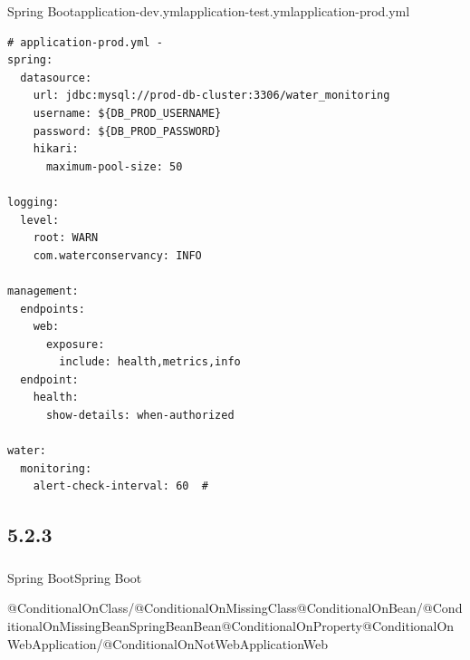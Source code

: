 Spring
Bootapplication-dev.ymlapplication-test.ymlapplication-prod.yml

\begin{lstlisting}
# application-prod.yml - 
spring:
  datasource:
    url: jdbc:mysql://prod-db-cluster:3306/water_monitoring
    username: ${DB_PROD_USERNAME}
    password: ${DB_PROD_PASSWORD}
    hikari:
      maximum-pool-size: 50
      
logging:
  level:
    root: WARN
    com.waterconservancy: INFO
    
management:
  endpoints:
    web:
      exposure:
        include: health,metrics,info
  endpoint:
    health:
      show-details: when-authorized

water:
  monitoring:
    alert-check-interval: 60  # 
\end{lstlisting}

\hypertarget{section-26}{%
\subsection{5.2.3}\label{section-26}}

\hypertarget{section-27}{%
\subsubsection{}\label{section-27}}

Spring BootSpring
Boot

\important{}@ConditionalOnClass/@ConditionalOnMissingClass@ConditionalOnBean/@ConditionalOnMissingBeanSpringBeanBean\important{}@ConditionalOnProperty@ConditionalOnWebApplication/@ConditionalOnNotWebApplicationWeb


